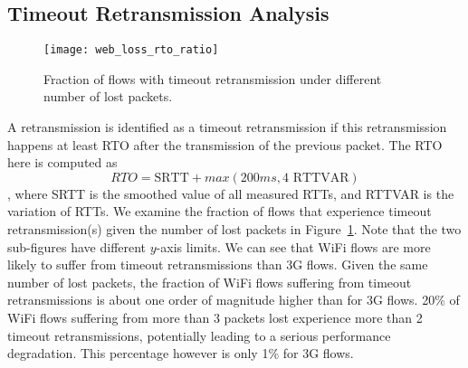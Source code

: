 \subsection{Timeout Retransmission Analysis}

\begin{figure}[th]
\centering
\texttt{[image: web\_loss\_rto\_ratio]}
\caption{Fraction of flows with timeout retransmission under different number of lost packets.}
\label{fig:web_loss_rto_ratio}
\end{figure}


A retransmission is identified as a timeout retransmission if this retransmission happens at least RTO after the transmission of the previous packet. The RTO here is computed as~\cite{rfc62982011computing} $$RTO=\text{SRTT} + max(200ms, 4 \text{ RTTVAR})$$, where SRTT is the smoothed value of all measured RTTs, and RTTVAR is the variation of RTTs. We examine the fraction of flows that experience timeout retransmission(s) given the number of lost packets in Figure~\ref{fig:web_loss_rto_ratio}. Note that the two sub-figures have different $y$-axis limits. We can see that WiFi flows are more likely to suffer from timeout retransmissions than 3G flows. Given the same number of lost packets, the fraction of WiFi flows suffering from timeout retransmissions is about one order of magnitude higher than for 3G flows. 20\% of WiFi flows suffering from more than 3 packets lost experience more than 2 timeout retransmissions, potentially leading to a serious performance degradation. This percentage however is only 1\% for 3G flows.

